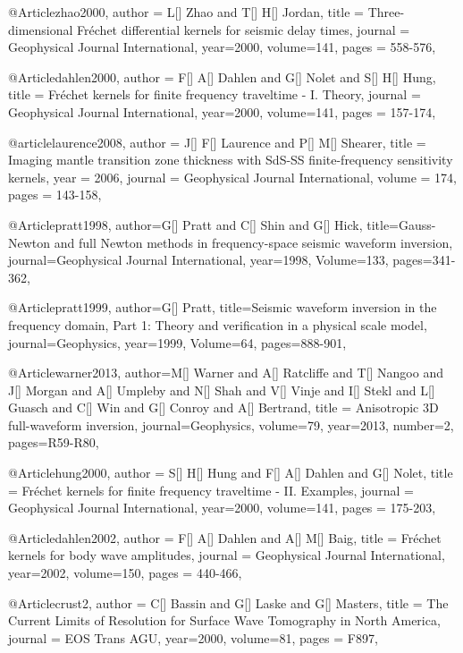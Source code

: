 @Article{zhao2000,
  author =	 {L[] Zhao and T[] H[] Jordan},
  title =	 {Three-dimensional Fr\'{e}chet differential kernels for seismic delay times},
  journal =	 {Geophysical Journal International},
  year=2000,
  volume=141,
  pages =	 {558-576},
}

@Article{dahlen2000,
  author =	 {F[] A[] Dahlen and G[] Nolet and S[] H[] Hung},
  title =	 {Fr\'{e}chet kernels for finite frequency traveltime - {I}. Theory},
  journal =	 {Geophysical Journal International},
  year=2000,
  volume=141,
  pages =	 {157-174},
}

@article{laurence2008,
author = {J[] F[] Laurence and P[] M[] Shearer},
title = {Imaging mantle transition zone thickness with {S}d{S-SS} finite-frequency sensitivity kernels},
year = {2006},
journal = {Geophysical Journal International},
volume = {174},
pages = {143-158},
}

@Article{pratt1998,
  author={G[] Pratt and C[] Shin and G[] Hick},
  title={Gauss-{N}ewton and full {N}ewton methods in frequency-space seismic waveform inversion},
  journal={Geophysical Journal International},
  year=1998,
  Volume=133,
  pages={341-362},
}

@Article{pratt1999,
  author={G[] Pratt},
  title={Seismic waveform inversion in the frequency domain, {P}art 1: {T}heory and verification in a physical scale model},
  journal={Geophysics},
  year=1999,
  Volume=64,
  pages={888-901},
}

@Article{warner2013,
  author={M[] Warner and A[] Ratcliffe and T[] Nangoo and J[] Morgan and A[] Umpleby and N[] Shah and V[] Vinje and I[] Stekl and L[] Guasch and C[] Win and G[] Conroy and A[] Bertrand},
  title = {Anisotropic 3{D} full-waveform inversion},
  journal={Geophysics},
  volume=79,
  year=2013,
  number=2,
  pages={R59-R80},
}

@Article{hung2000,
  author =	 {S[] H[] Hung and F[] A[] Dahlen and G[] Nolet},
  title =	 {Fr\'{e}chet kernels for finite frequency traveltime - {II}. Examples},
  journal =	 {Geophysical Journal International},
  year=2000,
  volume=141,
  pages =	 {175-203},
}


@Article{dahlen2002,
  author =	 {F[] A[] Dahlen and A[] M[] Baig},
  title =	 {Fr\'{e}chet kernels for body wave amplitudes},
  journal =	 {Geophysical Journal International},
  year=2002,
  volume=150,
  pages =	 {440-466},
}


@Article{crust2,
  author =	 {C[] Bassin and G[] Laske and G[] Masters},
  title =	 {The Current Limits of Resolution for Surface Wave Tomography in North America},
  journal =	 {EOS Trans AGU},
  year=2000,
  volume=81,
  pages =	 {F897},
}

